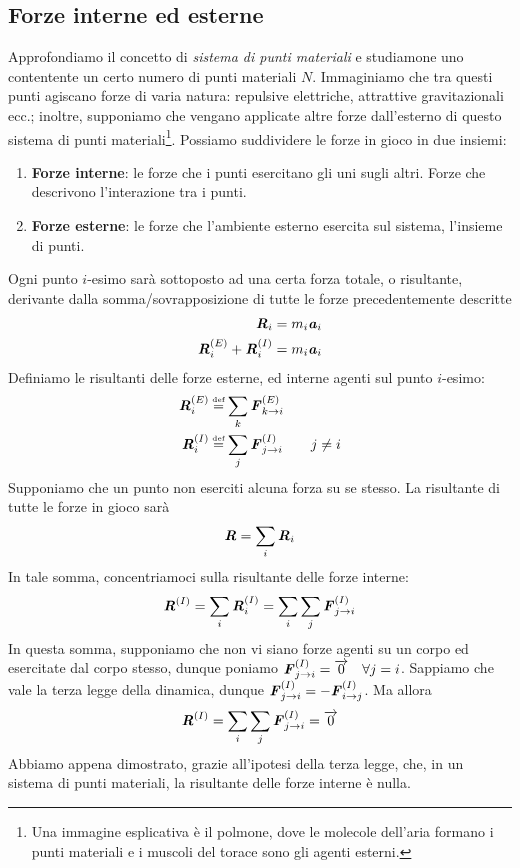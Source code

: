 \subsection{Forze interne ed esterne}
Approfondiamo il concetto di \textit{sistema di punti materiali} e studiamone
uno contentente un certo numero di punti materiali $N$. Immaginiamo che
tra questi punti agiscano forze di varia natura: repulsive elettriche,
attrattive gravitazionali ecc.; inoltre, supponiamo che vengano applicate
altre forze dall'esterno di questo sistema di punti materiali\footnote{Una
immagine esplicativa è il polmone, dove le molecole dell'aria formano i
punti materiali e i muscoli del torace sono gli agenti esterni.}.
Possiamo suddividere le forze in gioco in due insiemi:
\begin{enumerate}
    \item \textbf{Forze interne}: le forze che i punti esercitano gli uni
    sugli altri. Forze che descrivono l'interazione tra i punti.
    \item \textbf{Forze esterne}: le forze che l'ambiente esterno esercita
    sul sistema, l'insieme di punti.
\end{enumerate}
Ogni punto $i$-esimo sarà sottoposto ad una certa forza totale, o risultante, derivante
dalla somma/sovrapposizione di tutte le forze precedentemente descritte
\begin{align*}
    \textbf{\textit{R}}_i = m_i\textbf{\textit{a}}_i\\
    \textbf{\textit{R}}^{(E)}_i + \textbf{\textit{R}}^{(I)}_i = m_i\textbf{\textit{a}}_i
\end{align*}
Definiamo le risultanti delle forze esterne, ed interne agenti sul punto
$i$-esimo:
\begin{align*}
    \vecsymb{R}^{(E)}_i &\eqdef \sum_{k} \vecsymb{F}^{(E)}_{k \to i}\\
    \vecsymb{R}^{(I)}_i &\eqdef \sum_{j} \vecsymb{F}^{(I)}_{j \to i} \qquad j \not = i
\end{align*}
Supponiamo che un punto non eserciti alcuna forza su se stesso.
La risultante di tutte le forze in gioco sarà
\[ \textbf{\textit{R}} = \sum_{i} \textbf{\textit{R}}_i \]
In tale somma, concentriamoci sulla risultante delle forze interne:
\[ \textbf{\textit{R}}^{(I)} = \sum_{i} \textbf{\textit{R}}^{(I)}_i = \sum_{i} \sum_{j} \textbf{\textit{F}}^{(I)}_{j \to i} \]
In questa somma, supponiamo che non vi siano forze agenti su un corpo
ed esercitate dal corpo stesso, dunque poniamo $\textbf{\textit{F}}^{(I)}_{j \to i} = \overrightarrow{0} \quad \forall j = i$.
Sappiamo che vale la terza legge della dinamica, dunque
$\textbf{\textit{F}}^{(I)}_{j \to i} = -\textbf{\textit{F}}^{(I)}_{i \to j}$. Ma allora
\begin{align}
    \textbf{\textit{R}}^{(I)} = \sum_{i} \sum_{j} \textbf{\textit{F}}^{(I)}_{j \to i} = \overrightarrow{0}\label{interne}
\end{align}
Abbiamo appena dimostrato, grazie all'ipotesi della terza legge,
che, in un sistema di punti materiali, la risultante delle forze interne
è nulla.

